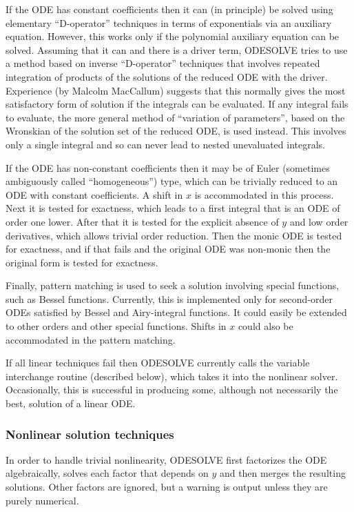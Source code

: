 If the ODE has constant coefficients then it can (in principle) be
solved using elementary ``D-operator'' techniques in terms of
exponentials via an auxiliary equation.  However, this works only if
the polynomial auxiliary equation can be solved.  Assuming that it can
and there is a driver term, ODESOLVE tries to use a method based
on inverse ``D-operator'' techniques that involves repeated
integration of products of the solutions of the reduced ODE with the
driver.  Experience (by Malcolm MacCallum) suggests that this normally
gives the most satisfactory form of solution if the integrals can be
evaluated.  If any integral fails to evaluate, the more general method
of ``variation of parameters'', based on the Wronskian of the solution
set of the reduced ODE, is used instead.  This involves only a single
integral and so can never lead to nested unevaluated integrals.

If the ODE has non-constant coefficients then it may be of Euler
(sometimes ambiguously called ``homogeneous'') type, which can be
trivially reduced to an ODE with constant coefficients.  A shift in
$x$ is accommodated in this process.  Next it is tested for exactness,
which leads to a first integral that is an ODE of order one lower.
After that it is tested for the explicit absence of $y$ and low order
derivatives, which allows trivial order reduction.  Then the monic ODE
is tested for exactness, and if that fails and the original ODE was
non-monic then the original form is tested for exactness.

Finally, pattern matching is used to seek a solution involving special
functions, such as Bessel functions.  Currently, this is implemented
only for second-order ODEs satisfied by Bessel and Airy-integral
functions.  It could easily be extended to other orders and other
special functions.  Shifts in $x$ could also be accommodated in the
pattern matching.

If all linear techniques fail then ODESOLVE currently calls the
variable interchange routine (described below), which takes it into
the nonlinear solver.  Occasionally, this is successful in producing
some, although not necessarily the best, solution of a linear ODE.


\subsubsection{Nonlinear solution techniques}

In order to handle trivial nonlinearity, ODESOLVE first
factorizes the ODE algebraically, solves each factor that depends on
$y$ and then merges the resulting solutions.  Other factors are
ignored, but a warning is output unless they are purely numerical.

